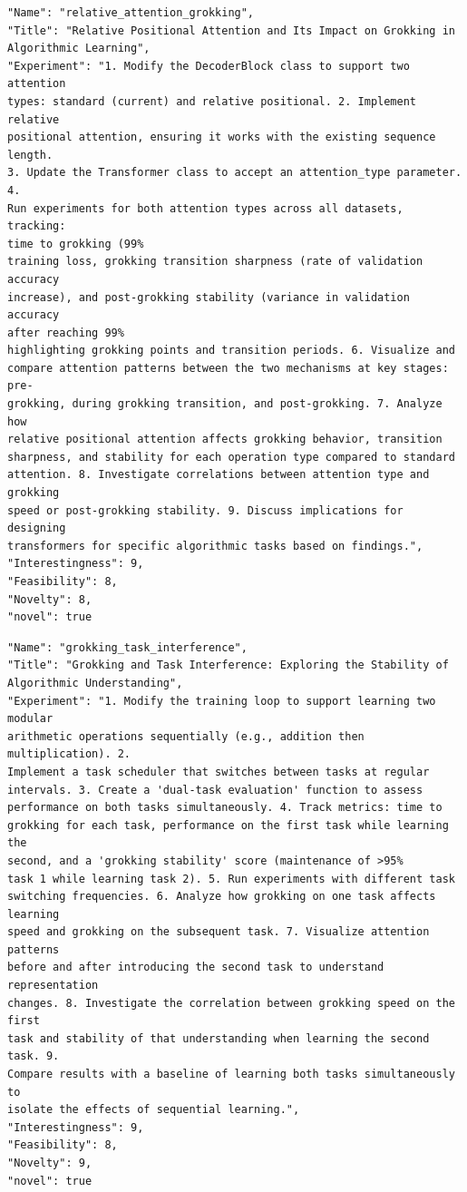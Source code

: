 \begin{tcolorbox}[breakable,colback=blue!5!white, colframe=blue!75!black, title=Idea 35/50 - \texttt{relative\_attention\_grokking}]
\small
\begin{verbatim}
"Name": "relative_attention_grokking",
"Title": "Relative Positional Attention and Its Impact on Grokking in
Algorithmic Learning",
"Experiment": "1. Modify the DecoderBlock class to support two attention
types: standard (current) and relative positional. 2. Implement relative
positional attention, ensuring it works with the existing sequence length.
3. Update the Transformer class to accept an attention_type parameter. 4.
Run experiments for both attention types across all datasets, tracking:
time to grokking (99%
training loss, grokking transition sharpness (rate of validation accuracy
increase), and post-grokking stability (variance in validation accuracy
after reaching 99%
highlighting grokking points and transition periods. 6. Visualize and
compare attention patterns between the two mechanisms at key stages: pre-
grokking, during grokking transition, and post-grokking. 7. Analyze how
relative positional attention affects grokking behavior, transition
sharpness, and stability for each operation type compared to standard
attention. 8. Investigate correlations between attention type and grokking
speed or post-grokking stability. 9. Discuss implications for designing
transformers for specific algorithmic tasks based on findings.",
"Interestingness": 9,
"Feasibility": 8,
"Novelty": 8,
"novel": true
\end{verbatim}
\end{tcolorbox}

\begin{tcolorbox}[breakable,colback=blue!5!white, colframe=blue!75!black, title=Idea 36/50 - \texttt{grokking\_task\_interference}]
\small
\begin{verbatim}
"Name": "grokking_task_interference",
"Title": "Grokking and Task Interference: Exploring the Stability of
Algorithmic Understanding",
"Experiment": "1. Modify the training loop to support learning two modular
arithmetic operations sequentially (e.g., addition then multiplication). 2.
Implement a task scheduler that switches between tasks at regular
intervals. 3. Create a 'dual-task evaluation' function to assess
performance on both tasks simultaneously. 4. Track metrics: time to
grokking for each task, performance on the first task while learning the
second, and a 'grokking stability' score (maintenance of >95%
task 1 while learning task 2). 5. Run experiments with different task
switching frequencies. 6. Analyze how grokking on one task affects learning
speed and grokking on the subsequent task. 7. Visualize attention patterns
before and after introducing the second task to understand representation
changes. 8. Investigate the correlation between grokking speed on the first
task and stability of that understanding when learning the second task. 9.
Compare results with a baseline of learning both tasks simultaneously to
isolate the effects of sequential learning.",
"Interestingness": 9,
"Feasibility": 8,
"Novelty": 9,
"novel": true
\end{verbatim}
\end{tcolorbox}

